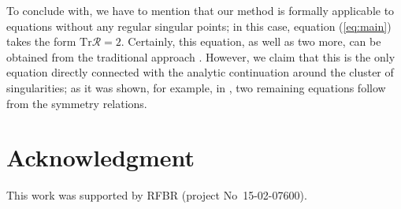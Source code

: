 \documentclass[asy]{iosart2x}
\def\R{\bm{\mathcal{R}}}
\def\Tr{\mathrm{Tr}}
\newcommand\eref[1]{(\ref{#1})}
\begin{document}
To conclude with, we have to mention that our method is formally applicable to equations without any regular
singular points; in this case, equation \eref{eq:main} takes the form $\Tr \R = 2$. Certainly, this equation,
as well as two more, can be obtained from the traditional approach \cite{frpaper}. However, we claim that this is the only equation
directly connected with the analytic continuation around the cluster of singularities; as it was shown,
for example, in \cite{aksymm}, two remaining equations follow from the symmetry relations.

\section*{Acknowledgment}
This work was supported by RFBR (project No~15-02-07600).
\end{document}
